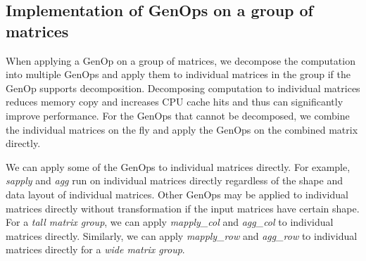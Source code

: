 


\subsection{Implementation of GenOps on a group of matrices}

When applying a GenOp on a group of matrices,
we decompose the computation into multiple GenOps and apply them to individual
matrices in the group if the GenOp supports decomposition. Decomposing computation
to individual matrices reduces memory copy and increases CPU cache hits and thus
can significantly improve performance. For the GenOps that cannot be decomposed,
we combine the individual matrices on the fly and apply the GenOps on the combined
matrix directly.

We can apply some of the GenOps to individual matrices directly. For example,
\textit{sapply} and \textit{agg} run on individual matrices directly regardless
of the shape and data layout of individual matrices. Other GenOps may be applied
to individual matrices directly without transformation if the input matrices
have certain shape. For a \textit{tall matrix group}, we can apply
\textit{mapply\_col} and \textit{agg\_col} to individual matrices directly.
Similarly, we can apply \textit{mapply\_row} and \textit{agg\_row} to
individual matrices directly for a \textit{wide matrix group}. %

